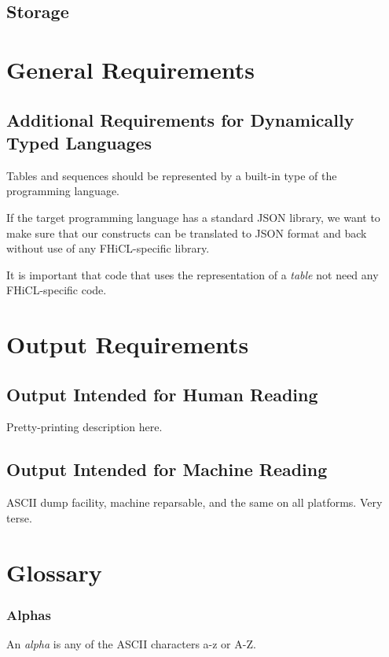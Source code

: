 \documentclass{memarticle}
\begin{document}
	\subsection{Storage}
		
		
\section{General Requirements}

	\subsection{Additional Requirements for Dynamically Typed Languages}

		Tables and sequences should be represented by a built-in type of the
		programming language.

		If the target programming language has a standard JSON library, we
		want to make sure that our constructs can be translated to JSON format
		and back without use of any FHiCL-specific library.

		It is important that code that uses the representation of a
		\emph{table} not need any FHiCL-specific code.

\section{Output Requirements}

	\subsection{Output Intended for Human Reading}
  		Pretty-printing description here.
	\subsection{Output Intended for Machine Reading}
  		ASCII dump facility, machine reparsable, and the same on all
  		platforms. Very terse.

\section{Glossary}
		\subsubsection{Alphas}
			An \emph{alpha} is any of the ASCII characters a-z or A-Z.
\end{document}

